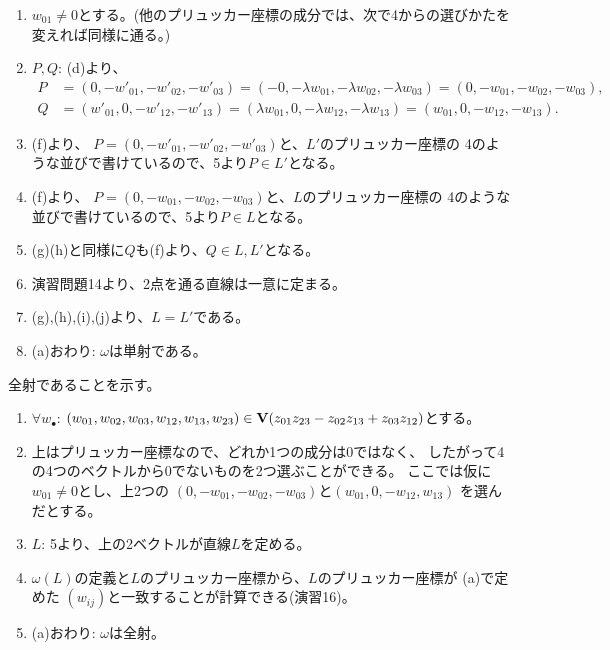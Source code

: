 \begin{myproof}
\begin{enumerate}
\begin{enumerate}
      (b)と(c)より、$w_{ij} = \lambda w_{ij}'$が$0\le i < j\le 3$
      となる。
      \item
      $w_{01}\neq 0$とする。(他のプリュッカー座標の成分では、次で4からの選びかたを変えれば同様に通る。)
      \item
      $P,Q$: (d)より、
      \begin{align}
        P
        &=
        (0,-w'_{01},-w'_{02},-w'_{03})
        =
        (-0,-\lambda w_{01},-\lambda w_{02}, -\lambda w_{03})
        =
        (0,-w_{01},-w_{02},-w_{03}),\\
        Q
        &=
        (w'_{01},0,-w'_{12},-w'_{13})
        =
        (\lambda w_{01},0,-\lambda w_{12},-\lambda w_{13})
        =
        (w_{01},0,-w_{12},-w_{13}).
      \end{align}
      \item (f)より、
      $P = (0,-w'_{01},-w'_{02},-w'_{03})$と、$L'$のプリュッカー座標の
      4のような並びで書けているので、5より$P \in L'$となる。
      \item (f)より、
      $P = (0,-w_{01},-w_{02},-w_{03})$と、$L$のプリュッカー座標の
      4のような並びで書けているので、5より$P\in L$となる。
      \item
      (g)(h)と同様に$Q$も(f)より、$Q\in L,L'$となる。
      \item
      演習問題14より、2点を通る直線は一意に定まる。
      \item
      (g),(h),(i),(j)より、$L=L'$である。
      \item
      (a)おわり: $\omega$は単射である。
    \end{enumerate}

    全射であることを示す。
    \begin{enumerate}
      \item
      $\forall w_{\bullet}$:
      $(w_{01},w_{02},w_{03},w_{12},w_{13},w_{23}) \in
      \textbf V(z_{01}z_{23}-z_{02}z_{13}+z_{03}z_{12})$とする。
      \item
      上はプリュッカー座標なので、どれか1つの成分は0ではなく、
      したがって4の4つのベクトルから0でないものを2つ選ぶことができる。
      ここでは仮に$w_{01} \neq 0$とし、上2つの
      $(0,-w_{01},-w_{02},-w_{03})$と$(w_{01},0,-w_{12},w_{13})$
      を選んだとする。
      \item $L$:
      5より、上の2ベクトルが直線$L$を定める。
      \item
      $\omega(L)$の定義と$L$のプリュッカー座標から、$L$のプリュッカー座標が
      (a)で定めた
      $(w_{ij})$と一致することが計算できる(演習16)。
      \item
      (a)おわり: $\omega$は全射。
    \end{enumerate}
  \end{enumerate}
\end{myproof}

